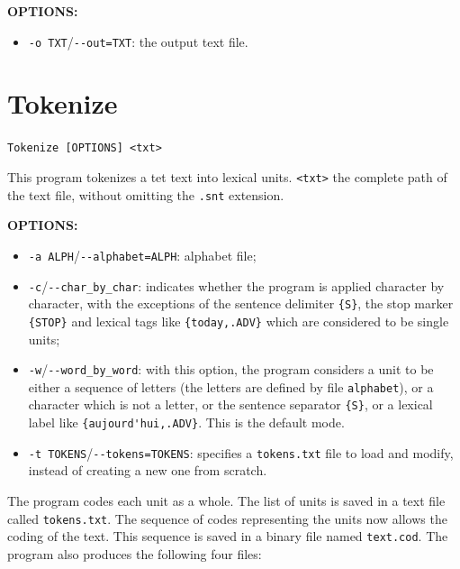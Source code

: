 \bigskip
\noindent \textbf{OPTIONS:}
\begin{itemize}
  \item \verb+-o TXT+/\verb+--out=TXT+: the output text file.
\end{itemize}







\section{Tokenize}
\verb+Tokenize [OPTIONS] <txt>+

\bigskip
\noindent This program tokenizes a tet text into lexical units.
\verb+<txt>+ the complete path of the text file, without omitting the \verb+.snt+ 
extension.

\bigskip
\noindent \textbf{OPTIONS:}
\begin{itemize}
  \item \verb+-a ALPH+/\verb+--alphabet=ALPH+: alphabet file;
  
  \item \verb+-c+/\verb+--char_by_char+: indicates whether the program is applied character by
  character, with the exceptions of the sentence delimiter \verb+{S}+,
  the stop marker \verb+{STOP}+ and lexical tags like \verb+{today,.ADV}+ which
  are considered to be single units;

 \item \verb+-w+/\verb+--word_by_word+: with this option, the program
  considers a unit to be either a sequence of letters (the letters are defined
  by file \verb+alphabet+), or a character which is not a letter, or the
  sentence separator \verb+{S}+, or a lexical label 
  like \verb+{aujourd'hui,.ADV}+. 
   This is the default mode.

 \item \verb+-t TOKENS+/\verb+--tokens=TOKENS+: specifies a \verb+tokens.txt+
 file to load and modify, instead of creating a new one from scratch.
\end{itemize}


\bigskip
\noindent The program codes each unit as a whole. The list of units is saved in a text file
called \verb+tokens.txt+. The sequence of codes representing the units now allows
the coding of the text. This sequence is saved in a binary file named
\verb+text.cod+. The program also produces the following four files:

